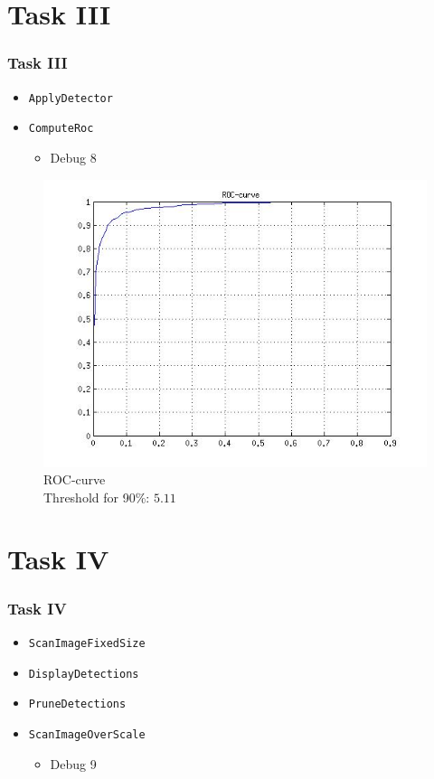 \documentclass{beamer}
\newenvironment{debug}{
        \begin{itemize}
    }{\end{itemize}}
\newcommand{\debugpoint}[1]{\begin{debug} \item[] \dotfill \hspace{0.5cm} Debug #1 \end{debug}}
\begin{document}
\section{Task III}

\begin{frame}
\frametitle{Task III}
\begin{itemize}
    \item \texttt{ApplyDetector}
    \item \texttt{ComputeRoc}
        \debugpoint{8}
\end{itemize}
\begin{figure}
    \centering
    \includegraphics[width=0.4\linewidth]{PicturesResults/task3ROC.jpg}
    \caption{ROC-curve \\
    Threshold for 90\%: $5.11$}

\end{figure}

\end{frame}

\section{Task IV}

\begin{frame}
\frametitle{Task IV}
\begin{itemize}
    \item \texttt{ScanImageFixedSize}
    \item \texttt{DisplayDetections}
    \item \texttt{PruneDetections}
    \item \texttt{ScanImageOverScale}
        \debugpoint{9}
\end{itemize}
\end{frame}
\end{document}
